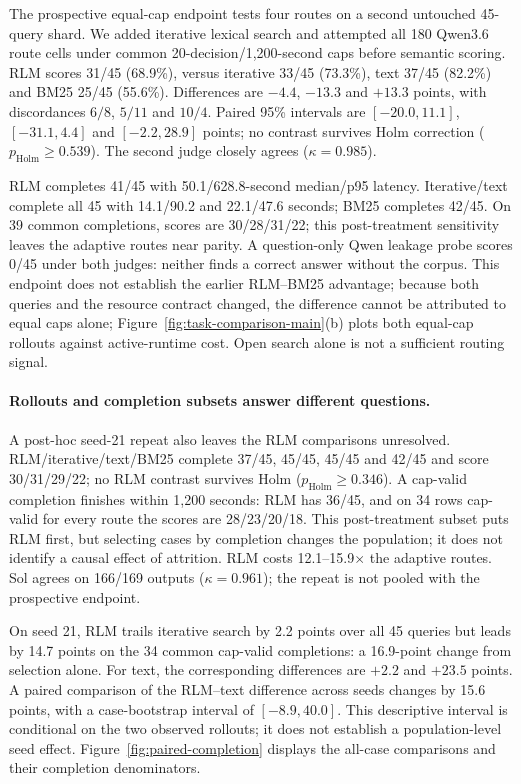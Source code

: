 \documentclass{article}
\begin{document}
The prospective equal-cap endpoint tests four routes on a second untouched 45-query shard. We added iterative lexical search and attempted all 180 Qwen3.6 route cells under common 20-decision/1,200-second caps before semantic scoring. RLM scores 31/45 (68.9\%), versus iterative 33/45 (73.3\%), text 37/45 (82.2\%) and BM25 25/45 (55.6\%). Differences are $-4.4$, $-13.3$ and $+13.3$ points, with discordances $6/8$, $5/11$ and $10/4$. Paired 95\% intervals are $[-20.0,11.1]$, $[-31.1,4.4]$ and $[-2.2,28.9]$ points; no contrast survives Holm correction ($p_{\mathrm{Holm}}\geq0.539$). The second judge closely agrees ($\kappa{=}0.985$).

RLM completes 41/45 with 50.1/628.8-second median/p95 latency. Iterative/text complete all 45 with 14.1/90.2 and 22.1/47.6 seconds; BM25 completes 42/45. On 39 common completions, scores are 30/28/31/22; this post-treatment sensitivity leaves the adaptive routes near parity. A question-only Qwen leakage probe scores 0/45 under both judges: neither finds a correct answer without the corpus. This endpoint does not establish the earlier RLM--BM25 advantage; because both queries and the resource contract changed, the difference cannot be attributed to equal caps alone; Figure~\ref{fig:task-comparison-main}(b) plots both equal-cap rollouts against active-runtime cost. Open search alone is not a sufficient routing signal.

\paragraph{Rollouts and completion subsets answer different questions.}
A post-hoc seed-21 repeat also leaves the RLM comparisons unresolved. RLM/iterative/text/BM25 complete 37/45, 45/45, 45/45 and 42/45 and score 30/31/29/22; no RLM contrast survives Holm ($p_{\mathrm{Holm}}\geq0.346$). A cap-valid completion finishes within 1,200 seconds: RLM has 36/45, and on 34 rows cap-valid for every route the scores are 28/23/20/18. This post-treatment subset puts RLM first, but selecting cases by completion changes the population; it does not identify a causal effect of attrition. RLM costs 12.1--15.9$\times$ the adaptive routes. Sol agrees on 166/169 outputs ($\kappa{=}0.961$); the repeat is not pooled with the prospective endpoint.

On seed 21, RLM trails iterative search by 2.2 points over all 45 queries but leads by 14.7 points on the 34 common cap-valid completions: a 16.9-point change from selection alone. For text, the corresponding differences are $+2.2$ and $+23.5$ points. A paired comparison of the RLM--text difference across seeds changes by 15.6 points, with a case-bootstrap interval of $[-8.9,40.0]$. This descriptive interval is conditional on the two observed rollouts; it does not establish a population-level seed effect. Figure~\ref{fig:paired-completion} displays the all-case comparisons and their completion denominators.
\end{document}
